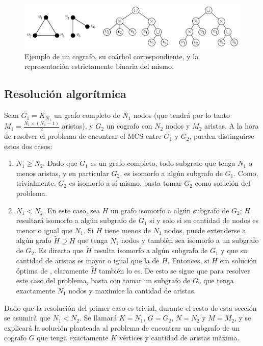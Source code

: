 \begin{figure}[htbp]
    \centering
    \includegraphics{imagenes/cografos-ejemplo-coarbol.pdf}
    \caption{Ejemplo de un cografo, su coárbol correspondiente, y la
    representación estrictamente binaria del mismo.}
    \label{fig:cografos:ejemplo-coarbol}
\end{figure}

\subsection{Resolución algorítmica}
Sean $G_1 = K_{N_1}$ un grafo completo de $N_1$ nodos (que tendrá por lo tanto
$M_1 = \frac{N_1 \times (N_1 - 1)}{2}$ aristas), y $G_2$ un cografo con $N_2$
nodos y $M_2$ aristas. A la hora de resolver el problema de encontrar el \acr
{MCS} entre $G_1$ y $G_2$, pueden distinguirse estos dos casos:
\begin{enumerate}
    \item $N_1 \geq N_2$. Dado que $G_1$ es un grafo completo, todo
    subgrafo que tenga $N_1$ o menos aristas, y en particular $G_2$,
    es isomorfo a algún subgrafo de $G_1$. Como, trivialmente, $G_2$ es
    isomorfo a sí mismo, basta tomar $G_2$ como solución del problema.
    \item $N_1 < N_2$. En este caso, sea $H$ un grafo isomorfo a algún
    subgrafo de $G_2$; $H$ resultará isomorfo a algún subgrafo de $G_1$ si
    y solo si su cantidad de nodos es menor o igual que $N_1$. Si $H$ tiene
    menos de $N_1$ nodos, puede extenderse a algún grafo $\tilde{H} \supseteq
    H$ que tenga $N_1$ nodos y también sea isomorfo a un subgrafo de $G_2$.
    Es directo que $\tilde{H}$ resulta isomorfo a algún subgrafo de $G_1$ y
    que su cantidad de aristas es mayor o igual que la de $H$. Entonces, si
    $H$ era solución óptima de , claramente $\tilde{H}$ también lo
    es. De esto se sigue que para resolver este caso del problema, basta con
    tomar un subgrafo de $G_2$ que tenga exactamente $N_1$ nodos y maximice la
    cantidad de aristas.
\end{enumerate}

Dado que la resolución del primer caso es trivial, durante el resto de esta
sección se asumirá que $N_1 < N_2$. Se llamará $K = N_1$, $G = G_2$, $N = N_2$
y $M = M_2$, y se explicará la solución planteada al problema de encontrar un
subgrafo de un cografo $G$ que tenga exactamente $K$ vértices y cantidad de
aristas máxima.

